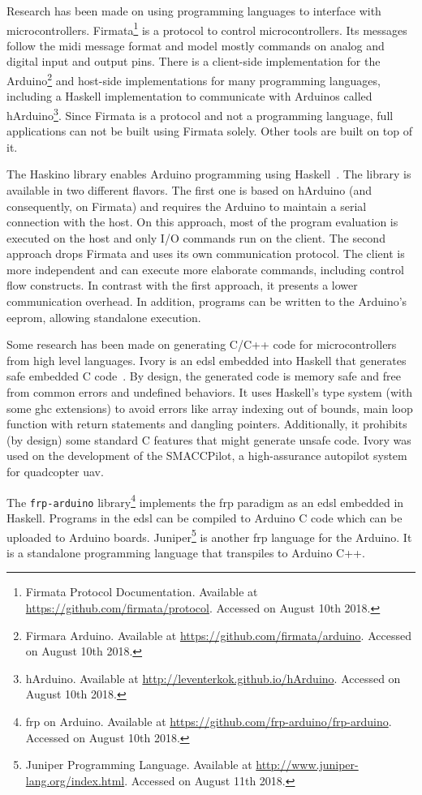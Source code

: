 Research has been made on using programming languages to interface with microcontrollers. Firmata\footnote{Firmata Protocol Documentation. Available at \url{https://github.com/firmata/protocol}. Accessed on August 10th 2018.} is a protocol to control microcontrollers. Its messages follow the \acs{midi} message format and model mostly commands on analog and digital input and output pins. There is a client-side implementation for the Arduino\footnote{Firmara Arduino. Available at \url{https://github.com/firmata/arduino}. Accessed on August 10th 2018.} and host-side implementations for many programming languages, including a Haskell implementation to communicate with Arduinos called hArduino\footnote{hArduino. Available at \url{http://leventerkok.github.io/hArduino}. Accessed on August 10th 2018.}. Since Firmata is a protocol and not a programming language, full applications can not be built using Firmata solely. Other tools are built on top of it.

The Haskino library enables Arduino programming using Haskell~\cite{haskino}. The library is available in two different flavors. The first one is based on hArduino (and consequently, on Firmata) and requires the Arduino to maintain a serial connection with the host. On this approach, most of the program evaluation is executed on the host and only I/O commands run on the client. The second approach drops Firmata and uses its own communication protocol. The client is more independent and can execute more elaborate commands, including control flow constructs. In contrast with the first approach, it presents a lower communication overhead. In addition, programs can be written to the Arduino's \acs{eeprom}, allowing standalone execution.

Some research has been made on generating C/C++ code for microcontrollers from high level languages. Ivory is an \ac{edsl} embedded into Haskell that generates safe embedded C code~\cite{ivory1,ivory2}. By design, the generated code is memory safe and free from common errors and undefined behaviors. It uses Haskell's type system (with some \acs{ghc} extensions) to avoid errors like array indexing out of bounds, main loop function with return statements and dangling pointers. Additionally, it prohibits (by design) some standard C features that might generate unsafe code. Ivory was used on the development of the SMACCPilot, a high-assurance autopilot system for quadcopter \ac{uav}.

The \texttt{frp-arduino} library\footnote{\acs{frp} on Arduino. Available at \url{https://github.com/frp-arduino/frp-arduino}. Accessed on August 10th 2018.} implements the \ac{frp} paradigm as an \ac{edsl} embedded in Haskell. Programs in the \ac{edsl} can be compiled to Arduino C code which can be uploaded to Arduino boards. Juniper\footnote{Juniper Programming Language. Available at \url{http://www.juniper-lang.org/index.html}. Accessed on August 11th 2018.} is another \ac{frp} language for the Arduino. It is a standalone programming language that transpiles to Arduino C++.

